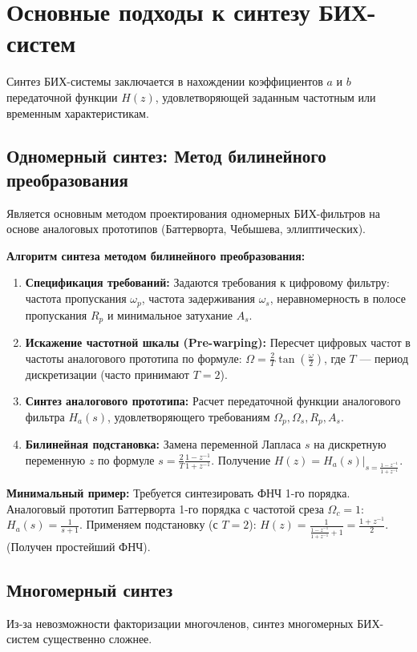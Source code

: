 \documentclass[12pt,a4paper]{article}
\begin{document}
\section{Основные подходы к синтезу БИХ-систем}

Синтез БИХ-системы заключается в нахождении коэффициентов $a$ и $b$ передаточной функции $H(z)$, удовлетворяющей заданным частотным или временным характеристикам.

\subsection{Одномерный синтез: Метод билинейного преобразования}
Является основным методом проектирования одномерных БИХ-фильтров на основе аналоговых прототипов (Баттерворта, Чебышева, эллиптических).

\textbf{Алгоритм синтеза методом билинейного преобразования:}
\begin{enumerate}[label=\textbf{Шаг \arabic*.}, leftmargin=*]
    \item \textbf{Спецификация требований:} Задаются требования к цифровому фильтру: частота пропускания $\omega_p$, частота задерживания $\omega_s$, неравномерность в полосе пропускания $R_p$ и минимальное затухание $A_s$.
    \item \textbf{Искажение частотной шкалы (Pre-warping):} Пересчет цифровых частот в частоты аналогового прототипа по формуле: $\Omega = \frac{2}{T} \tan\left(\frac{\omega}{2}\right)$, где $T$ — период дискретизации (часто принимают $T=2$).
    \item \textbf{Синтез аналогового прототипа:} Расчет передаточной функции аналогового фильтра $H_a(s)$, удовлетворяющего требованиям $\Omega_p, \Omega_s, R_p, A_s$.
    \item \textbf{Билинейная подстановка:} Замена переменной Лапласа $s$ на дискретную переменную $z$ по формуле $s = \frac{2}{T}\frac{1 - z^{-1}}{1 + z^{-1}}$. Получение $H(z) = \left. H_a(s) \right|_{s = \frac{1 - z^{-1}}{1 + z^{-1}}}$.
\end{enumerate}

\textbf{Минимальный пример:}
Требуется синтезировать ФНЧ 1-го порядка.
Аналоговый прототип Баттерворта 1-го порядка с частотой среза $\Omega_c=1$: $H_a(s) = \frac{1}{s+1}$.
Применяем подстановку (с $T=2$):
$H(z) = \frac{1}{\frac{1-z^{-1}}{1+z^{-1}} + 1} = \frac{1+z^{-1}}{2}$. (Получен простейший ФНЧ).

\subsection{Многомерный синтез}
Из-за невозможности факторизации многочленов, синтез многомерных БИХ-систем существенно сложнее.
\end{document}
